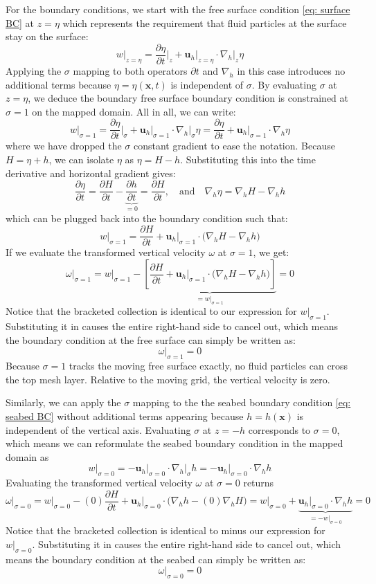 \documentclass{article}
\newcommand{\uh}{\mathbf{u}_h}
\newcommand{\nablah}{\nabla_h}
\newcommand{\ddt}[1]{\frac{\partial #1}{\partial t}}
\begin{document}
For the boundary conditions, we start with the free surface condition \eqref{eq: surface BC} at $z = \eta$ which represents the requirement that fluid particles at the surface stay on the surface:
$$w\big|_{z=\eta} = \ddt{\eta}\bigg|_{z} + \uh\big|_{z=\eta} \cdot \nablah|_{z} \eta$$
Applying the $\sigma$ mapping to both operators $\partial t$ and $\nablah$ in this case introduces no additional terms because $\eta = \eta(\mathbf{x}, t)$ is independent of $\sigma$.
By evaluating $\sigma$ at $z=\eta$, we deduce the boundary free surface boundary condition is constrained at $\sigma=1$ on the mapped domain. 
All in all, we can write:
$$w\big|_{\sigma=1} = \ddt{\eta}\bigg|_{\sigma} + \uh\big|_{\sigma=1} \cdot \nablah|_{\sigma} \eta = \ddt{\eta} + \uh\big|_{\sigma=1} \cdot \nablah \eta $$
where we have dropped the $\sigma$ constant gradient to ease the notation.
Because $H = \eta + h$, we can isolate $\eta$ as $\eta = H - h$. 
Substituting this into the time derivative and horizontal gradient gives:
$$\ddt{\eta} = \ddt{H} - \underbrace{\ddt{h}}_{=0} = \ddt{H}, \quad \text{and} \quad \nablah \eta = \nablah H - \nablah h$$
which can be plugged back into the boundary condition such that:
$$w\big|_{\sigma=1} = \ddt{H} + \uh\big|_{\sigma=1} \cdot \big(\nablah H - \nablah h\big)$$
If we evaluate the transformed vertical velocity $\omega$ at $\sigma = 1$, we get:
$$\omega\big|_{\sigma=1} = w\big|_{\sigma=1} - \underbrace{\left[ \ddt{H} + \uh\big|_{\sigma=1} \cdot \big(\nablah H - \nablah h\Big) \right]}_{=w|_{\sigma=1}} = 0$$
Notice that the bracketed collection is identical to our expression for $w\big|_{\sigma=1}$. 
Substituting it in causes the entire right-hand side to cancel out, which means the boundary condition at the free surface can simply be written as:
$$\boxed{\omega\big|_{\sigma=1} = 0}$$
Because $\sigma=1$ tracks the moving free surface exactly, no fluid particles can cross the top mesh layer. 
Relative to the moving grid, the vertical velocity is zero.


Similarly, we can apply the $\sigma$ mapping to the the seabed boundary condition \eqref{eq: seabed BC} without additional terms appearing because $h=h(\mathbf{x})$ is independent of the vertical axis. 
Evaluating $\sigma$ at $z=-h$ corresponds to $\sigma=0$, which means we can reformulate the seabed boundary condition in the mapped domain as 
$$w\big|_{\sigma=0} = -\uh\big|_{\sigma=0} \cdot \nablah\big|_{\sigma} h = -\uh\big|_{\sigma=0} \cdot \nablah h$$
Evaluating the transformed vertical velocity $\omega$ at $\sigma=0$ returns
$$\omega\big|_{\sigma=0} = w\big|_{\sigma=0} -  (0) \ddt{H} + \uh\big|_{\sigma=0}  \cdot \big( \nablah h - (0) \nablah H \big) = w\big|_{\sigma=0} + \underbrace{\uh\big|_{\sigma=0}  \cdot \nablah h}_{=-w|_{\sigma=0}} = 0$$
Notice that the bracketed collection is identical to minus our expression for $w\big|_{\sigma=0}$. 
Substituting it in causes the entire right-hand side to cancel out, which means the boundary condition at the seabed can simply be written as:
$$\boxed{\omega\big|_{\sigma=0} = 0}$$
\end{document}
